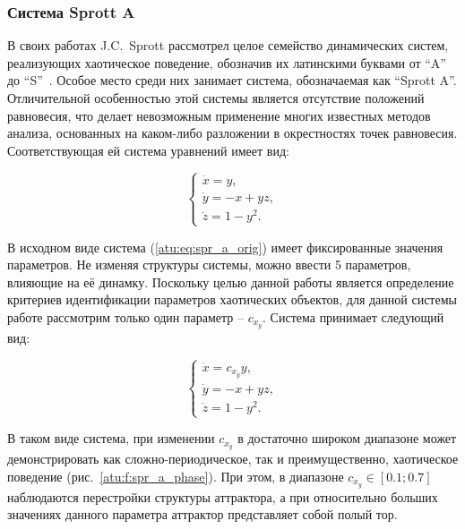 
\FloatBarrier
\subsubsection{Система Sprott A}


В своих работах J.C.~Sprott рассмотрел целое семейство динамических
систем, реализующих хаотическое поведение, обозначив их латинскими буквами
от ``A'' до ``S''~\cite{sprott_212}. Особое место среди них
занимает система, обозначаемая как ``Sprott A''. Отличительной особенностью
этой системы является отсутствие положений равновесия, что делает
невозможным применение многих известных методов анализа, основанных на
каком-либо разложении в окрестностях точек равновесия. Соответствующая ей
система уравнений имеет вид:

\begin{equation}
  \begin{cases}
    \dot{x} =  y, \\
    \dot{y} = -x + yz, \\
    \dot{z} =  1 - y^2.
  \end{cases}
  \label{atu:eq:spr_a_orig}
\end{equation}


В исходном виде система (\ref{atu:eq:spr_a_orig}) имеет фиксированные значения параметров.
Не изменяя структуры системы, можно ввести 5 параметров, влияющие на её динамку.
Поскольку целью данной работы является определение критериев идентификации параметров
хаотических объектов, для данной системы
работе рассмотрим только один параметр -- $c_{x_y} $. Система принимает следующий вид:

\begin{equation}
  \begin{cases}
    \dot{x} =  c_{x_y} y, \\
    \dot{y} = -x + yz, \\
    \dot{z} =  1 - y^2.
  \end{cases}
  \label{atu:eq:spr_a}
\end{equation}

В таком виде система, при изменении $c_{x_y} $
в достаточно широком диапазоне может демонстрировать как
сложно-периодическое, так и преимущественно, хаотическое
поведение (рис.~\ref{atu:f:spr_a_phase}). При этом, в диапазоне $c_{x_y} \in [0.1 ; 0.7] $
наблюдаются перестройки структуры аттрактора, а при относительно больших
значениях данного параметра аттрактор представляет собой полый тор.


